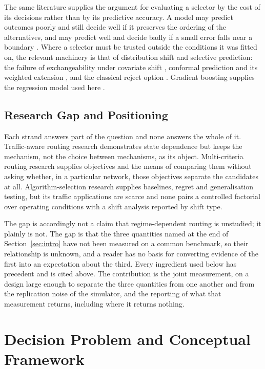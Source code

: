\documentclass[preprint,12pt]{elsarticle}
\begin{document}
The same literature supplies the argument for evaluating a selector by the cost
of its decisions rather than by its predictive accuracy. A model may predict
outcomes poorly and still decide well if it preserves the ordering of the
alternatives, and may predict well and decide badly if a small error falls near a
boundary \citep{elmachtoub2022spo}. Where a selector must be trusted outside the
conditions it was fitted on, the relevant machinery is that of distribution shift
and selective prediction: the failure of exchangeability under covariate shift
\citep{shimodaira2000}, conformal prediction and its weighted extension
\citep{vovk2005alrw,lei2018conformal,tibshirani2019covshift}, and the classical
reject option \citep{chow1970reject}. Gradient boosting supplies the regression
model used here \citep{friedman2001gbm,ke2017lightgbm}.

\subsection{Research Gap and Positioning}
\label{sec:gap}

Each strand answers part of the question and none answers the whole of it.
Traffic-aware routing research demonstrates state dependence but keeps the
mechanism, not the choice between mechanisms, as its object. Multi-criteria
routing research supplies objectives and the means of comparing them without
asking whether, in a particular network, those objectives separate the
candidates at all. Algorithm-selection research supplies baselines, regret and
generalisation testing, but its traffic applications are scarce and none pairs a
controlled factorial over operating conditions with a shift analysis reported by
shift type.

The gap is accordingly not a claim that regime-dependent routing is unstudied;
it plainly is not. The gap is that the three quantities named at the end of
Section~\ref{sec:intro} have not been measured on a common benchmark, so their
relationship is unknown, and a reader has no basis for converting evidence of the
first into an expectation about the third. Every ingredient used below has
precedent and is cited above. The contribution is the joint measurement, on a
design large enough to separate the three quantities from one another and from
the replication noise of the simulator, and the reporting of what that
measurement returns, including where it returns nothing.

\section{Decision Problem and Conceptual Framework}
\label{sec:problem}
\end{document}
